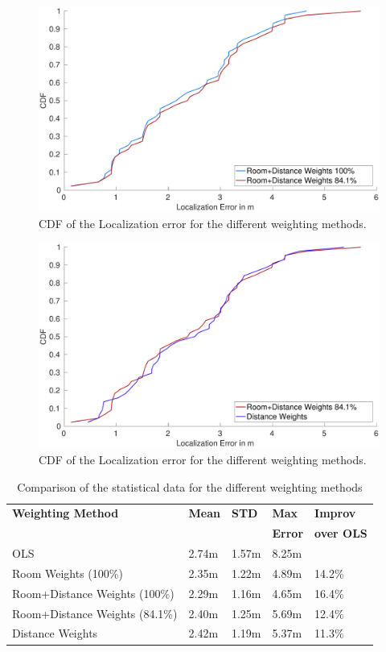 \begin{figure}[h]
\centering
\includegraphics[width=\textwidth]{Figures/WeightingCDF_realRW}
\decoRule
\caption[Weighting method comparison]{CDF of the Localization error for the different weighting methods.}
\label{fig:WeightingResultsCDF}
\end{figure}

\begin{figure}[h]
\centering
\includegraphics[width=\textwidth]{Figures/WeightingCDF_realDistance}
\decoRule
\caption[Weighting method comparison]{CDF of the Localization error for the different weighting methods.}
\label{fig:WeightingResultsCDF}
\end{figure}

\begin{table}[h]
\centering
\begin{tabular}{l l l l l}
\toprule
\textbf{Weighting Method}&\textbf{Mean}&\textbf{STD}&\textbf{Max}&\textbf{Improv}\\
&&\textbf{}&\textbf{Error}&\textbf{over OLS}\\
\midrule
OLS&2.74m&1.57m&8.25m&\\
Room Weights (100\%)&2.35m&1.22m&4.89m&14.2\%\\
Room+Distance Weights (100\%)&2.29m&1.16m&4.65m&16.4\%\\
Room+Distance Weights (84.1\%)&2.40m&1.25m&5.69m&12.4\%\\
Distance Weights&2.42m&1.19m&5.37m&11.3\%\\
\bottomrule
\end{tabular}
\caption[Weighting method comparison]{Comparison of the statistical data for the different weighting methods}
\label{tab:WeightingStatisticalValues}
\end{table}

